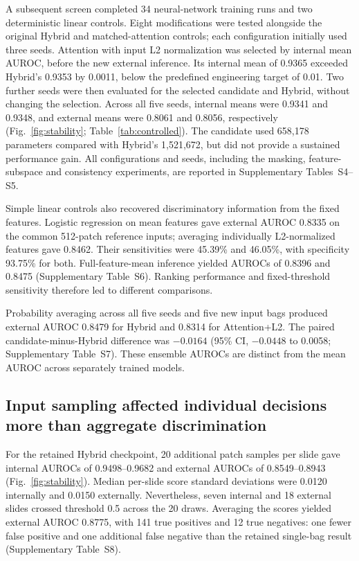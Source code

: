A subsequent screen completed 34 neural-network training runs and two deterministic linear controls. Eight modifications were tested alongside the original Hybrid and matched-attention controls; each configuration initially used three seeds. Attention with input L2 normalization was selected by internal mean AUROC, before the new external inference. Its internal mean of 0.9365 exceeded Hybrid's 0.9353 by 0.0011, below the predefined engineering target of 0.01. Two further seeds were then evaluated for the selected candidate and Hybrid, without changing the selection. Across all five seeds, internal means were 0.9341 and 0.9348, and external means were 0.8061 and 0.8056, respectively (Fig.~\ref{fig:stability}; Table~\ref{tab:controlled}). The candidate used 658,178 parameters compared with Hybrid's 1,521,672, but did not provide a sustained performance gain. All configurations and seeds, including the masking, feature-subspace and consistency experiments, are reported in Supplementary Tables~S4--S5.

Simple linear controls also recovered discriminatory information from the fixed features. Logistic regression on mean features gave external AUROC 0.8335 on the common 512-patch reference inputs; averaging individually L2-normalized features gave 0.8462. Their sensitivities were 45.39\% and 46.05\%, with specificity 93.75\% for both. Full-feature-mean inference yielded AUROCs of 0.8396 and 0.8475 (Supplementary Table~S6). Ranking performance and fixed-threshold sensitivity therefore led to different comparisons.

Probability averaging across all five seeds and five new input bags produced external AUROC 0.8479 for Hybrid and 0.8314 for Attention+L2. The paired candidate-minus-Hybrid difference was $-0.0164$ (95\% CI, $-0.0448$ to 0.0058; Supplementary Table~S7). These ensemble AUROCs are distinct from the mean AUROC across separately trained models.


\subsection{Input sampling affected individual decisions more than aggregate discrimination}
For the retained Hybrid checkpoint, 20 additional patch samples per slide gave internal AUROCs of 0.9498--0.9682 and external AUROCs of 0.8549--0.8943 (Fig.~\ref{fig:stability}). Median per-slide score standard deviations were 0.0120 internally and 0.0150 externally. Nevertheless, seven internal and 18 external slides crossed threshold 0.5 across the 20 draws. Averaging the scores yielded external AUROC 0.8775, with 141 true positives and 12 true negatives: one fewer false positive and one additional false negative than the retained single-bag result (Supplementary Table~S8).

